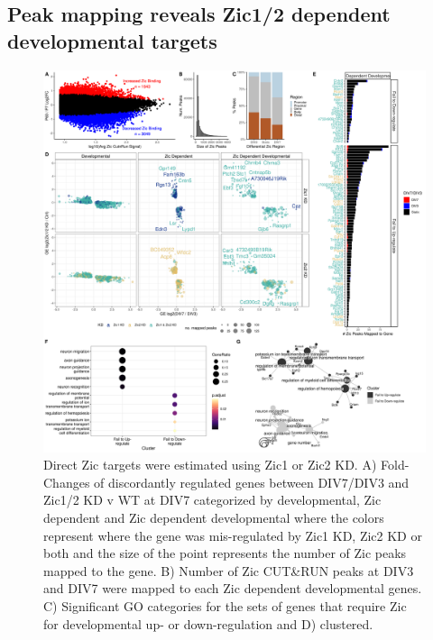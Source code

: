 \documentclass[fleqn,10pt]{wlscirep}
\begin{document}
\subsection*{Peak mapping reveals Zic1/2 dependent developmental targets}
\begin{figure}[!ht]
\includegraphics[width=.95\textwidth]{../figures/figure4.png}
\caption{Direct Zic targets were estimated using Zic1 or Zic2 KD. A) Fold-Changes of discordantly regulated genes between DIV7/DIV3 and Zic1/2 KD v WT at DIV7 categorized by developmental, Zic dependent and Zic dependent developmental where the colors represent where the gene was mis-regulated by Zic1 KD, Zic2 KD or both and the size of the point represents the number of Zic peaks mapped to the gene. B) Number of Zic CUT&RUN peaks at DIV3 and DIV7 were mapped to each Zic dependent developmental genes. C) Significant GO categories for the sets of genes that require Zic for developmental up- or down-regulation and D) clustered. }
\label{fig:ZicKD}
\end{figure}
\end{document}
